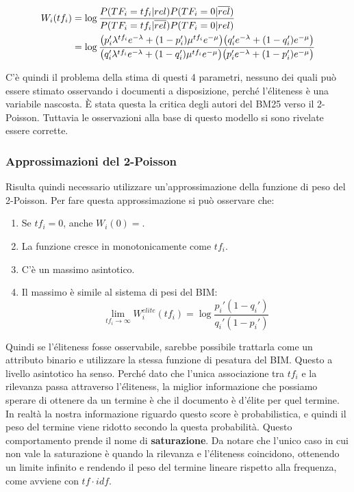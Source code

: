 \begin{align}
W_i(tf_i) &=  \log\frac{ P(TF_i = tf_i | rel) P(TF_i = 0 | \overline{rel}) }{P(TF_i = tf_i | \overline{rel}) P(TF_i = 0 | rel)} \\
&= \log \frac{
\big(p_i'\lambda^{tf_i}e^{-\lambda} + (1-p_i')\mu^{tf_i}e^{-\mu}\big)\big(q_i'e^{-\lambda} + (1-q_i')e^{-\mu}\big)
}{
\big(q_i'\lambda^{tf_i}e^{-\lambda} + (1-q_i')\mu^{tf_i}e^{-\mu}\big)\big(p_i'e^{-\lambda} + (1-p_i')e^{-\mu}\big)
} \label{eq:wtf}
\end{align}


C'è quindi il problema della stima di questi 4 parametri, nessuno dei quali può essere stimato osservando i documenti a disposizione, perché l'éliteness è una variabile nascosta. \`E stata questa la critica degli autori del BM25 verso il 2-Poisson. Tuttavia le osservazioni alla base di questo modello si sono rivelate essere corrette.


\subsubsection{Approssimazioni del 2-Poisson}

Risulta quindi necessario utilizzare un'approssimazione della funzione di peso del 2-Poisson.
Per fare questa approssimazione si può osservare che:

\begin{enumerate}
	\item Se $tf_i = 0$, anche $W_i(0) = $.
	\item La funzione cresce in monotonicamente come $tf_i$.
	\item C'è un massimo asintotico.
	\item Il massimo è simile al sistema di pesi del BIM:
	$$
	\lim\limits_{tf_i \to \infty} W_i^{elite}(tf_i) = \log \frac{p_i'(1-q_i')}{q_i'(1-p_i')}
	$$
\end{enumerate}

Quindi se l'éliteness fosse osservabile, sarebbe possibile trattarla come un attributo binario e utilizzare la stessa funzione di pesatura del BIM.
Questo a livello asintotico ha senso. Perché dato che l'unica associazione tra $tf_i$ e la rilevanza passa attraverso l'éliteness, la miglior informazione che possiamo sperare di ottenere da un termine è che il documento è d'élite per quel termine. In realtà la nostra informazione riguardo questo score è probabilistica, e quindi il peso del termine viene ridotto secondo la questa probabilità. Questo comportamento prende il nome di \textbf{saturazione}.
Da notare che l'unico caso in cui non vale la saturazione è quando la rilevanza e l'éliteness coincidono, ottenendo un limite infinito e rendendo il peso del termine lineare rispetto alla frequenza, come avviene con $tf\cdot idf$.

